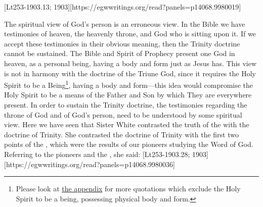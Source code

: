 [Lt253-1903.13; 1903][https://egwwritings.org/read?panels=p14068.9980019]


The spiritual view of God’s person is an erroneous view. In the Bible we have testimonies of heaven, the heavenly throne, and God who is sitting upon it. If we accept these testimonies in their obvious meaning, then the Trinity doctrine cannot be sustained. The Bible and Spirit of Prophecy present one God in heaven, as a personal being, having a body and form just as Jesus has. This view is not in harmony with the doctrine of the Triune God, since it requires the Holy Spirit to be a Being\footnote{Please look at \hyperref[appendix:unauthenticated-reports]{the appendix} for more quotations which exclude the Holy Spirit to be a being, possessing physical body and form.}, having a body and form—this idea would compromise the Holy Spirit to be a means of the Father and Son by which They are everywhere present. In order to sustain the Trinity doctrine, the testimonies regarding the throne of God and of God’s person, need to be understood by some spiritual view. Here we have seen that Sister White contrasted the truth of the  with the doctrine of Trinity. She contrasted the doctrine of Trinity with the first two points of the , which were the results of our pioneers studying the Word of God. Referring to the pioneers and the , she said: [Lt253-1903.28; 1903][https://egwwritings.org/read?panels=p14068.9980036]


